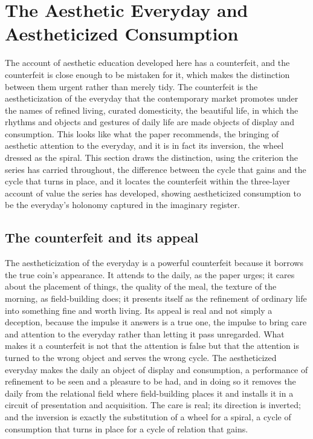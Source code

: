 \section{The Aesthetic Everyday and Aestheticized Consumption}
\label{p22:sec:fetishism}

\noindent
The account of aesthetic education developed here has a counterfeit, and the counterfeit is close enough to be mistaken for it, which makes the distinction between them urgent rather than merely tidy. The counterfeit is the aestheticization of the everyday that the contemporary market promotes under the names of refined living, curated domesticity, the beautiful life, in which the rhythms and objects and gestures of daily life are made objects of display and consumption. This looks like what the paper recommends, the bringing of aesthetic attention to the everyday, and it is in fact its inversion, the wheel dressed as the spiral. This section draws the distinction, using the criterion the series has carried throughout, the difference between the cycle that gains and the cycle that turns in place, and it locates the counterfeit within the three-layer account of value the series has developed, showing aestheticized consumption to be the everyday's holonomy captured in the imaginary register.

\subsection{The counterfeit and its appeal}
\label{p22:sub:fetish-counterfeit}

The aestheticization of the everyday is a powerful counterfeit because it borrows the true coin's appearance. It attends to the daily, as the paper urges; it cares about the placement of things, the quality of the meal, the texture of the morning, as field-building does; it presents itself as the refinement of ordinary life into something fine and worth living. Its appeal is real and not simply a deception, because the impulse it answers is a true one, the impulse to bring care and attention to the everyday rather than letting it pass unregarded. What makes it a counterfeit is not that the attention is false but that the attention is turned to the wrong object and serves the wrong cycle. The aestheticized everyday makes the daily an object of display and consumption, a performance of refinement to be seen and a pleasure to be had, and in doing so it removes the daily from the relational field where field-building places it and installs it in a circuit of presentation and acquisition. The care is real; its direction is inverted; and the inversion is exactly the substitution of a wheel for a spiral, a cycle of consumption that turns in place for a cycle of relation that gains.

